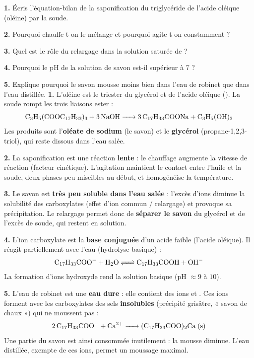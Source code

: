 \documentclass[11pt]{article}
\begin{document}
\begin{exoresolu}
\textbf{1.} Écris l'équation-bilan de la saponification du triglycéride de l'acide oléique (oléine) par la soude. \par
\textbf{2.} Pourquoi chauffe-t-on le mélange et pourquoi agite-t-on constamment ? \par
\textbf{3.} Quel est le rôle du relargage dans la solution saturée de  ? \par
\textbf{4.} Pourquoi le pH de la solution de savon est-il supérieur à 7 ? \par
\textbf{5.} Explique pourquoi le savon mousse moins bien dans l'eau de robinet que dans l'eau distillée.
\tcblower
\textbf{1.} L'oléine est le triester du glycérol et de l'acide oléique (). La soude rompt les trois liaisons ester :
\[ \ce{C3H5(COOC17H33)3 + 3 NaOH -> 3 C17H33COONa + C3H5(OH)3} \]
Les produits sont l'\textbf{oléate de sodium} (le savon) et le \textbf{glycérol} (propane-1,2,3-triol), qui reste dissous dans l'eau salée. \par
\textbf{2.} La saponification est une réaction \textbf{lente} : le chauffage augmente la vitesse de réaction (facteur cinétique). L'agitation maintient le contact entre l'huile et la soude, deux phases peu miscibles au début, et homogénéise la température. \par
\textbf{3.} Le savon est \textbf{très peu soluble dans l'eau salée} : l'excès d'ions  diminue la solubilité des carboxylates (effet d'ion commun / relargage) et provoque sa précipitation. Le relargage permet donc de \textbf{séparer le savon} du glycérol et de l'excès de soude, qui restent en solution. \par
\textbf{4.} L'ion carboxylate  est la \textbf{base conjuguée} d'un acide faible (l'acide oléique). Il réagit partiellement avec l'eau (hydrolyse basique) :
\[ \ce{C17H33COO- + H2O <=> C17H33COOH + OH-} \]
La formation d'ions hydroxyde  rend la solution basique (pH $\approx 9$ à $10$). \par
\textbf{5.} L'eau de robinet est une \textbf{eau dure} : elle contient des ions  et . Ces ions forment avec les carboxylates des sels \textbf{insolubles} (précipité grisâtre, « savon de chaux ») qui ne moussent pas :
\[ \ce{2 C17H33COO- + Ca^2+ -> (C17H33COO)2Ca (s)} \]
Une partie du savon est ainsi consommée inutilement : la mousse diminue. L'eau distillée, exempte de ces ions, permet un moussage maximal.
\end{exoresolu}
\end{document}
